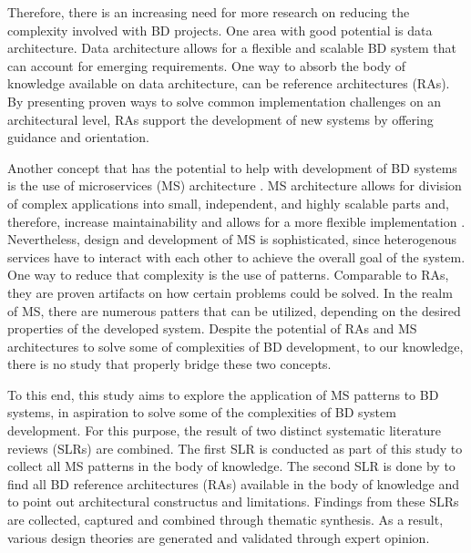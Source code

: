 \documentclass{bmcart}
\begin{document}
Therefore, there is an increasing need for more research on reducing the complexity involved with BD projects. One area with good potential is data architecture. Data architecture allows for a flexible and scalable BD system that can account for emerging requirements. One way to absorb the body of knowledge available on data architecture, can be reference architectures (RAs). By presenting proven ways to solve common implementation challenges on an architectural level, RAs support the development of new systems by offering guidance and orientation.





% 


Another concept that has the potential to help with development of BD systems is the use of microservices (MS) architecture \cite{freymann2020tackling}. MS architecture allows for division of complex applications into small, independent, and highly scalable parts and, therefore, increase maintainability and allows for a more flexible implementation \cite{Richardson.2022}. Nevertheless, design and development of MS is sophisticated, since heterogenous services have to interact with each other to achieve the overall goal of the system. One way to reduce that complexity is the use of patterns. Comparable to RAs, they are proven artifacts on how certain problems could be solved. In the realm of MS, there are numerous patters that can be utilized, depending on the desired properties of the developed system. Despite the potential of RAs and MS architectures to solve some of complexities of BD development, to our knowledge, there is no study that properly bridge these two concepts. 


To this end, this study aims to explore the application of MS patterns to BD systems, in aspiration to solve some of the complexities of BD system development. For this purpose, the result of two distinct systematic literature reviews (SLRs) are combined. The first SLR is conducted as part of this study to collect all MS patterns in the body of knowledge. The second SLR is done by \cite{ataei2022state} to find all BD reference architectures (RAs) available in the body of knowledge and to point out architectural constructus and limitations. Findings from these SLRs are collected, captured and combined through thematic synthesis. As a result, various design theories are generated and validated through expert opinion.  
\end{document}

